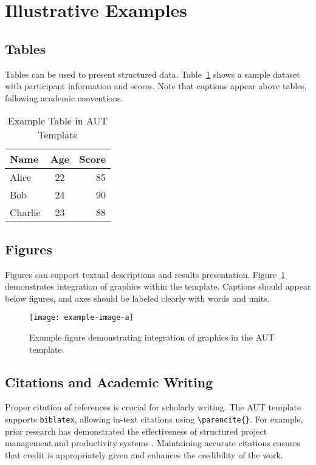 \documentclass{aut_document}
\begin{document}
\section{Illustrative Examples}

\subsection{Tables}

Tables can be used to present structured data. Table~\ref{tab:example} shows 
a sample dataset with participant information and scores. Note that captions 
appear above tables, following academic conventions.

\begin{table}[h]
\centering
\caption{Example Table in AUT Template}
\label{tab:example}
\begin{tabular}{l c r}
\hline
Name & Age & Score \\
\hline
Alice & 22 & 85 \\
Bob & 24 & 90 \\
Charlie & 23 & 88 \\
\hline
\end{tabular}
\end{table}

\subsection{Figures}

Figures can support textual descriptions and results presentation. Figure~\ref{fig:example} 
demonstrates integration of graphics within the template. Captions should appear 
below figures, and axes should be labeled clearly with words and units.

\begin{figure}[h]
\centering
\texttt{[image: example-image-a]}
\caption{Example figure demonstrating integration of graphics in the AUT template.}
\label{fig:example}
\end{figure}

\subsection{Citations and Academic Writing}

Proper citation of references is crucial for scholarly writing. The AUT template 
supports \texttt{biblatex}, allowing in-text citations using \verb|\parencite{}|. 
For example, prior research has demonstrated the effectiveness of structured 
project management \parencite{smith2023agile} and productivity systems \parencite{jones2024productivity}. 
Maintaining accurate citations ensures that credit is appropriately given and 
enhances the credibility of the work.
\end{document}
